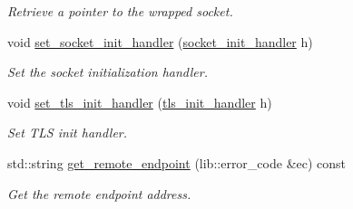\begin{DoxyCompactItemize}
\begin{DoxyCompactList}\small\item\em Retrieve a pointer to the wrapped socket. \end{DoxyCompactList}\item 
void \hyperlink{classwebsocketpp_1_1transport_1_1asio_1_1tls__socket_1_1connection_a67e80028e47cb8fb4f0a7f7adf8d9531}{set\+\_\+socket\+\_\+init\+\_\+handler} (\hyperlink{namespacewebsocketpp_1_1transport_1_1asio_1_1tls__socket_a1d7e715c2f7c5fc7add88d6a37724abb}{socket\+\_\+init\+\_\+handler} h)
\begin{DoxyCompactList}\small\item\em Set the socket initialization handler. \end{DoxyCompactList}\item 
void \hyperlink{classwebsocketpp_1_1transport_1_1asio_1_1tls__socket_1_1connection_a6d068194c8a9d5602d5717b2f379cb60}{set\+\_\+tls\+\_\+init\+\_\+handler} (\hyperlink{namespacewebsocketpp_1_1transport_1_1asio_1_1tls__socket_a8213f20abc47626ab3bf8db285fff3b3}{tls\+\_\+init\+\_\+handler} h)
\begin{DoxyCompactList}\small\item\em Set T\+LS init handler. \end{DoxyCompactList}\item 
std\+::string \hyperlink{classwebsocketpp_1_1transport_1_1asio_1_1tls__socket_1_1connection_a21c918cb3645fbf9300f22aabd065782}{get\+\_\+remote\+\_\+endpoint} (lib\+::error\+\_\+code \&ec) const
\begin{DoxyCompactList}\small\item\em Get the remote endpoint address. \end{DoxyCompactList}\end{DoxyCompactItemize}
